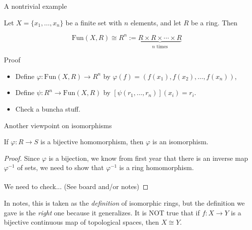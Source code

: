 \documentclass{beamer}
\begin{document}
\begin{frame}{A nontrivial example}
  \begin{lemma} Let $X=\{x_1,\dots, x_n\}$ be a finite set with $n$ elements, and let $R$ be a ring.  Then

    $$\text{Fun}(X,R)\cong R^n:=\underbrace{R\times R\times\cdots\times R}_{\text{$n$ times}}$$
    \end{lemma}
  \begin{block}{Proof}
    \begin{itemize}
\item    Define $\varphi:\text{Fun}(X,R)\to R^n$ by $\varphi(f)=(f(x_1),f(x_2),\dots, f(x_n))$,
\item    Define $\psi:R^n\to\text{Fun}(X,R)$ by $[\psi(r_1,\dots, r_n)](x_i)=r_i$.
\item Check a buncha stuff.
    \end{itemize}
   \end{block}
 
\end{frame}

\begin{frame}{Another viewpoint on isomorphisms}
  \begin{lemma} If $\varphi:R\to S$ is a bijective homomorphism, then $\varphi$ is an isomorphism.
  \end{lemma}

  \begin{proof} Since $\varphi$ is a bijection, we know from first year that there is an inverse map $\varphi^{-1}$ of sets, we need to show that $\varphi^{-1}$ is a ring homomorphism.  \\~\\

    We need to check... (See board and/or notes)\end{proof}

In notes, this is taken as the \emph{definition} of isomorphic rings, but the definition we gave is the \emph{right} one because it generalizes.  It is NOT true that if $f:X\to Y$ is a bijective continuous map of topological spaces, then $X\cong Y$.
  
\end{frame}
\end{document}
